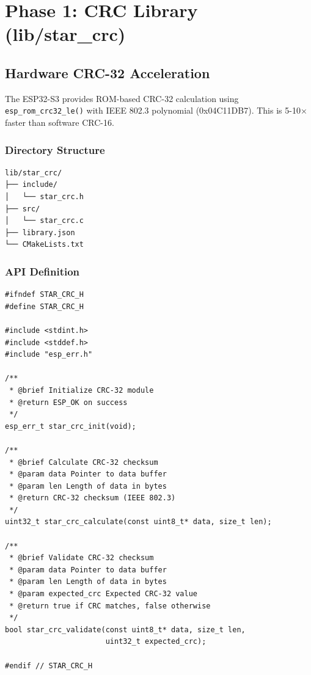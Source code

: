 \section{Phase 1: CRC Library (lib/star\_crc)}

\subsection{Hardware CRC-32 Acceleration}

The ESP32-S3 provides ROM-based CRC-32 calculation using \texttt{esp\_rom\_crc32\_le()} with IEEE 802.3 polynomial (0x04C11DB7). This is 5-10× faster than software CRC-16.

\subsubsection{Directory Structure}

\begin{verbatim}
lib/star_crc/
├── include/
│   └── star_crc.h
├── src/
│   └── star_crc.c
├── library.json
└── CMakeLists.txt
\end{verbatim}

\subsubsection{API Definition}

\begin{lstlisting}[caption={star\_crc.h - CRC-32 Interface}]
#ifndef STAR_CRC_H
#define STAR_CRC_H

#include <stdint.h>
#include <stddef.h>
#include "esp_err.h"

/**
 * @brief Initialize CRC-32 module
 * @return ESP_OK on success
 */
esp_err_t star_crc_init(void);

/**
 * @brief Calculate CRC-32 checksum
 * @param data Pointer to data buffer
 * @param len Length of data in bytes
 * @return CRC-32 checksum (IEEE 802.3)
 */
uint32_t star_crc_calculate(const uint8_t* data, size_t len);

/**
 * @brief Validate CRC-32 checksum
 * @param data Pointer to data buffer
 * @param len Length of data in bytes
 * @param expected_crc Expected CRC-32 value
 * @return true if CRC matches, false otherwise
 */
bool star_crc_validate(const uint8_t* data, size_t len,
                       uint32_t expected_crc);

#endif // STAR_CRC_H
\end{lstlisting}

